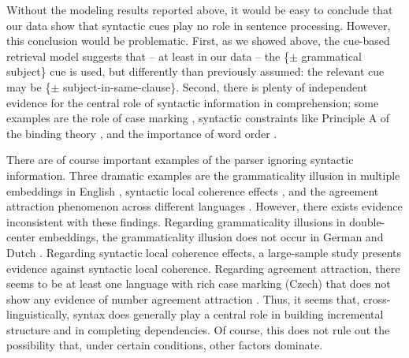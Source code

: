 \documentclass[review,preprint,12pt,authoryear,floatsintext]{elsarticle}
\begin{document}
{Without the modeling results reported above, it would be easy to conclude that our data show that syntactic cues play no role in sentence processing. However, this conclusion would be problematic. First, as we showed above, the cue-based retrieval model suggests that -- at least in our data -- the \{$\pm$ grammatical subject\} cue is used, but differently than previously assumed: the relevant cue may be \{$\pm$ subject-in-same-clause\}. Second, there is plenty of independent evidence for the central role of syntactic information in comprehension; some examples are the role of case marking \citep[e.g.,][]{Avetisyan_etal_2020_agree,HusainEtAl2014,bhatia2022processing,bader2000case,bader2006case,miyamoto2002case}, syntactic constraints like Principle A of the binding theory \citep[e.g.,][]{Sturt2003,dillon2013,yadav2021individual},  and 
the importance of word order \citep[e.g.,][]{meng2000mode}. 

There are of course important examples of the parser ignoring syntactic information. Three dramatic examples are the grammaticality illusion in multiple embeddings in English \citep{gibsonthomas99}, syntactic local coherence effects \citep{taboretal04}, and the agreement attraction phenomenon across different languages \citep[e.g.,][]{wagersetal,lago_etal_2021,tucker2015representing}.  However, there exists  evidence inconsistent with these findings. Regarding grammaticality illusions in double-center embeddings, the grammaticality illusion does not occur in German and Dutch \citep{VSLK11,FrankEtAl2015}. Regarding syntactic local coherence effects, a large-sample study \citep{lcpaape2023} presents evidence against syntactic local coherence. Regarding agreement attraction, there seems to be at least one language with rich case marking (Czech) that does not show any evidence of number agreement attraction \citep{chromy2023number}. Thus, it seems that, cross-linguistically, syntax does generally play a central role in building incremental structure and in completing dependencies. Of course, this does not rule out the possibility that, under certain conditions, other factors dominate.

}
\end{document}

